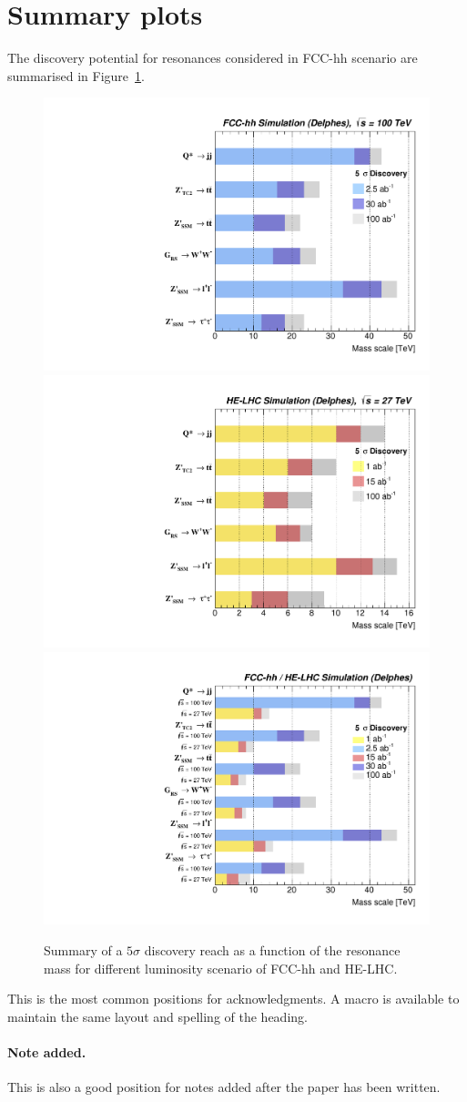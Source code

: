 \documentclass[a4paper,11pt]{article}
\begin{document}
\section{Summary plots}
The discovery potential for resonances considered in FCC-hh scenario are summarised in Figure~\ref{figure:resonances100:summary}.
\begin{figure}[!htb]
  \centering
  \includegraphics[width=0.45\columnwidth]{Fig/summaryDisco_onlyFCChh.pdf}
  \includegraphics[width=0.45\columnwidth]{Fig/summaryDisco_onlyHELHC.pdf}
    \includegraphics[width=0.45\columnwidth]{Fig/summaryDisco.pdf}

  \caption{Summary of a $5\sigma$ discovery reach as a function of the resonance mass for different luminosity scenario of FCC-hh and HE-LHC.}
  \label{figure:resonances100:summary}
\end{figure}


\acknowledgments

This is the most common positions for acknowledgments. A macro is
available to maintain the same layout and spelling of the heading.

\paragraph{Note added.} This is also a good position for notes added
after the paper has been written.
\end{document}
